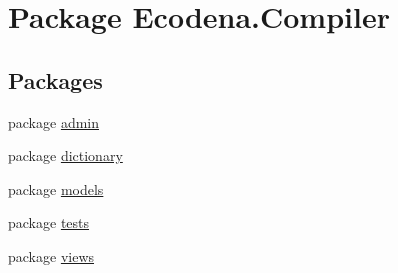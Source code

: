 \hypertarget{namespace_ecodena_1_1_compiler}{
\section{Package Ecodena.Compiler}
\label{d0/d83/namespace_ecodena_1_1_compiler}
}
\subsection*{Packages}
\begin{DoxyCompactItemize}
\item 
package \hyperlink{namespace_ecodena_1_1_compiler_1_1admin}{admin}
\item 
package \hyperlink{namespace_ecodena_1_1_compiler_1_1dictionary}{dictionary}
\item 
package \hyperlink{namespace_ecodena_1_1_compiler_1_1models}{models}
\item 
package \hyperlink{namespace_ecodena_1_1_compiler_1_1tests}{tests}
\item 
package \hyperlink{namespace_ecodena_1_1_compiler_1_1views}{views}
\end{DoxyCompactItemize}
